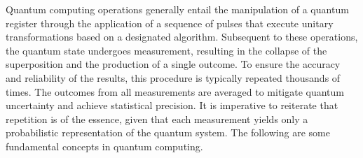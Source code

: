 Quantum computing operations generally entail the manipulation of a quantum register through the application of a sequence of pulses that execute unitary transformations based on a designated algorithm. Subsequent to these operations, the quantum state undergoes measurement, resulting in the collapse of the superposition and the production of a single outcome. To ensure the accuracy and reliability of the results, this procedure is typically repeated thousands of times. The outcomes from all measurements are averaged to mitigate quantum uncertainty and achieve statistical precision. It is imperative to reiterate that repetition is of the essence, given that each measurement yields only a probabilistic representation of the quantum system.  The following are some fundamental concepts in quantum computing.

	
